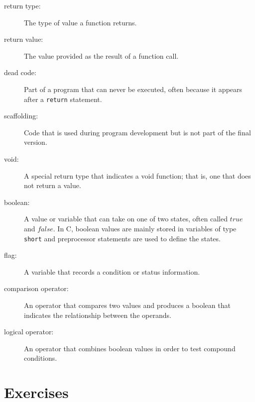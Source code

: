 \begin{description}

\item[return type:]  The type of value a function returns.

\item[return value:]  The value provided as the result of a function
call.

\item[dead code:]  Part of a program that can never be executed,
often because it appears after a {\tt return} statement.

\item[scaffolding:]  Code that is used during program development
but is not part of the final version.

\item[void:]  A special return type that indicates a void function;
that is, one that does not return a value.


\item[boolean:]  A value or variable that can take on one of
two states, often called $true$ and $false$.  In C, boolean
values are mainly stored in variables of type {\tt short} and 
preprocessor statements are used to define the states.

\item[flag:]  A variable that records
a condition or status information.

\item[comparison operator:]  An operator that compares two values
and produces a boolean that indicates the relationship between the
operands.

\item[logical operator:]  An operator that combines boolean values
in order to test compound conditions.


\end{description}

\section{Exercises}
\setcounter{exercisenum}{0}




